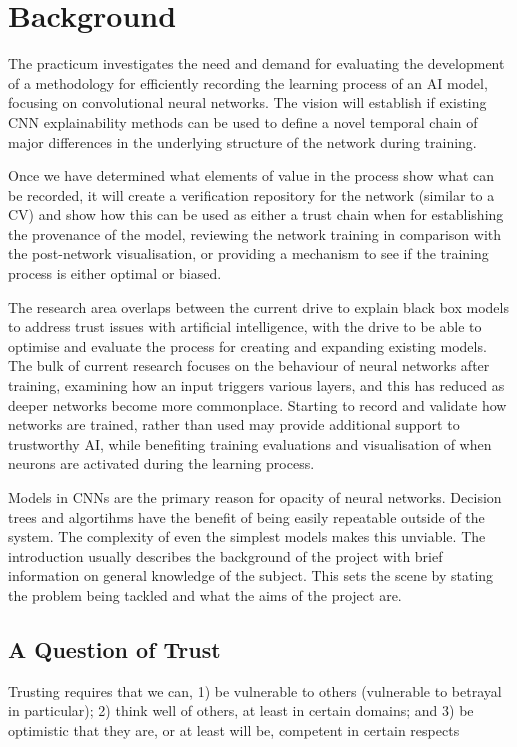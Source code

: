 \section{Background}

The practicum investigates the need and demand for evaluating the development of a methodology for efficiently recording the learning process of an AI model, focusing on convolutional neural networks. The vision will establish if existing CNN explainability methods can be used to define a novel temporal chain of major differences in the underlying structure of the network during training.
 
Once we have determined what elements of value in the process show what can be recorded, it will create a verification repository for the network (similar to a CV) and show how this can be used as either a trust chain when for establishing the provenance of the model, reviewing the network training in comparison with the post-network visualisation, or providing a mechanism to see if the training process is either optimal or biased.

The research area overlaps between the current drive to explain black box models to address trust issues with artificial intelligence, with the drive to be able to optimise and evaluate the process for creating and expanding existing models. The bulk of current research focuses on the behaviour of neural networks after training, examining how an input triggers various layers, and this has reduced as deeper networks become more commonplace. Starting to record and validate how networks are trained, rather than used may provide additional support to trustworthy AI, while benefiting training evaluations and visualisation of when neurons are activated during the learning process.

Models in CNNs are the primary reason for opacity of neural networks. Decision
trees and algortihms have the benefit of being easily repeatable outside of the
system. The complexity of even the simplest models makes this unviable. 
The introduction usually describes the background of the project with brief information on general knowledge of the subject. This sets the scene by stating the problem being tackled and what the aims of the project are.

\subsection{A Question of Trust}

Trusting requires that we can, 1) be vulnerable to others (vulnerable to betrayal in particular); 2) think well of others, at least in certain domains; and 3) be optimistic that they are, or at least will be, competent in certain respects 

